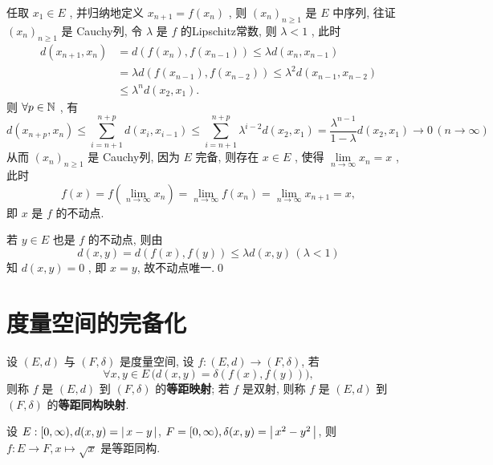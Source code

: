      \begin{Proof}
          任取 $ x_{1}\in E $ , 并归纳地定义 $ x_{n+1}=f(x_{n}) $ , 则 $ (x_{n})_{n\geqslant1} $ 是 $ E $ 中序列, 往证 $ (x_{n})_{n\geqslant1} $ 是 Cauchy列, 令 $ \lambda $ 是 $ f $ 的Lipschitz常数, 则 $ \lambda<1 $ , 此时
          \[
               \begin{aligned}
                    d(x_{n+1}, x_{n}) & = d(f(x_{n}), f(x_{n-1})) \leqslant \lambda d(x_{n}, x_{n-1}) \\
                    & =\lambda d(f(x_{n-1}), f(x_{n-2}))\leqslant \lambda^{2} d(x_{n-1}, x_{n-2}) \\
                    & \leqslant \lambda^{n} d(x_{2}, x_{1}).
               \end{aligned}
          \]
          则 $ \forall p\in \mathbb{N} $ , 有
          \[
               d(x_{n+p}, x_{n})\leqslant\sum_{i=n+1}^{n+p}d(x_{i}, x_{i-1})\leqslant\sum_{i=n+1}^{n+p}\lambda^{i-2}d(x_{2}, x_{1})=\frac{\lambda^{n-1}}{1-\lambda}d(x_{2}, x_{1})\to 0\,(n\to\infty)
          \]
          从而 $ (x_{n})_{n\geqslant1} $ 是 Cauchy列, 因为 $ E $ 完备, 则存在 $ x\in E $ , 使得 $ \lim\limits_{n\to \infty}x_{n}=x $ , 此时
          \[
               f(x)=f(\lim_{n\to\infty}x_{n})=\lim_{n\to\infty}f(x_{n})=\lim_{n\to\infty}x_{n+1}=x,
          \]
          即 $ x $ 是 $ f $ 的不动点.

          若 $ y\in E $ 也是 $ f $ 的不动点, 则由
          \[
               d(x, y)=d(f(x), f(y))\leqslant\lambda d(x, y)\,(\lambda<1)
          \]
          知 $ d(x, y)=0 $ , 即 $ x=y $, 故不动点唯一.\qed 
     \end{Proof}



\section{度量空间的完备化}
	\begin{Definition}[等距同构]\label{def:等距同构}
           设 $ (E, d) $ 与 $ (F, \delta) $ 是度量空间, 设 $ f:(E, d)\to(F, \delta) $, 若
           \[
                \forall x, y\in E\,\big(d(x, y)=\delta(f(x), f(y))\big),
           \] 
           则称 $ f $ 是 $ (E, d) $ 到 $ (F, \delta) $ 的\textbf{等距映射}; 若 $ f $ 是双射, 则称 $ f $ 是 $ (E, d) $ 到 $ (F, \delta) $ 的\textbf{等距同构映射}.
     \end{Definition}

     \begin{Example}
          设 $ E:[0,\infty), d(x, y)=\left| \,x-y\, \right|  $, $ F=[0, \infty), \delta(x, y)=\left| \,x^{2}-y^{2}\, \right|  $, 则 $ f:E\to F, x\mapsto \sqrt{x} $ 是等距同构. 
     \end{Example}

